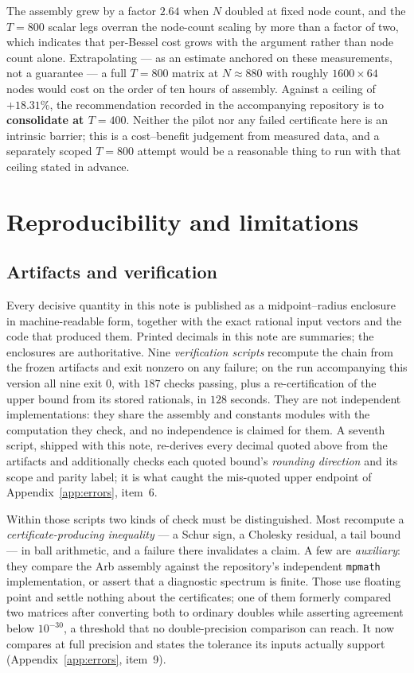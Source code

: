 \documentclass[11pt,a4paper]{article}
\theoremstyle{definition}
\theoremstyle{remark}
\newcommand{\src}[1]{{\footnotesize\texttt{#1}}}
\begin{document}
The assembly grew by a factor $2.64$ when $N$ doubled at fixed node count, and
the $T = 800$ scalar legs overran the node-count scaling by more than a factor
of two, which indicates that per-Bessel cost grows with the argument rather than
node count alone. Extrapolating --- as an estimate anchored on these
measurements, not a guarantee --- a full $T = 800$ matrix at $N \approx 880$ with
roughly $1600\times64$ nodes would cost on the order of ten hours of assembly.
Against a ceiling of $+18.31\%$, the recommendation recorded in the
accompanying repository is to \textbf{consolidate at $T = 400$}. Neither the
pilot nor any failed certificate here is an intrinsic barrier; this is a
cost--benefit judgement from measured data, and a separately scoped $T = 800$
attempt would be a reasonable thing to run with that ceiling stated in advance.

\section{Reproducibility and limitations}
\label{sec:repro}

\subsection{Artifacts and verification}

Every decisive quantity in this note is published as a midpoint--radius
enclosure in machine-readable form, together with the exact rational input
vectors and the code that produced them. Printed decimals in this note are
summaries; the enclosures are authoritative. Nine \emph{verification scripts}
recompute the chain from the frozen artifacts and exit nonzero on any failure;
on the run accompanying this version all nine exit $0$, with $187$ checks
passing, plus a re-certification of the upper bound from its stored rationals,
in $128$ seconds.
They are not independent implementations: they share the assembly and constants
modules with the computation they check, and no independence is claimed for
them. A seventh script, shipped with this note, re-derives every decimal quoted
above from the artifacts and additionally checks each quoted bound's
\emph{rounding direction} and its scope and parity label; it is what caught the
mis-quoted upper endpoint of Appendix~\ref{app:errors}, item~6.

Within those scripts two kinds of check must be distinguished. Most recompute a
\emph{certificate-producing inequality} --- a Schur sign, a Cholesky residual, a
tail bound --- in ball arithmetic, and a failure there invalidates a claim.
A few are \emph{auxiliary}: they compare the Arb assembly against the
repository's independent \src{mpmath} implementation, or assert that a
diagnostic spectrum is finite. Those use floating point and settle nothing about
the certificates; one of them formerly compared two matrices after converting
both to ordinary doubles while asserting agreement below $10^{-30}$, a threshold
that no double-precision comparison can reach. It now compares at full precision
and states the tolerance its inputs actually support
(Appendix~\ref{app:errors}, item~9).
\end{document}
